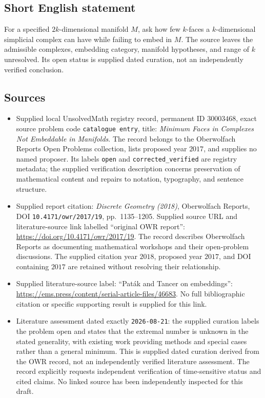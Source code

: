 \documentclass[11pt]{article}
\begin{document}
\subsection{Short English statement}
For a specified \(2k\)-dimensional manifold \(M\), ask how few \(k\)-faces a \(k\)-dimensional simplicial complex can have while failing to embed in \(M\). The source leaves the admissible complexes, embedding category, manifold hypotheses, and range of \(k\) unresolved. Its open status is supplied dated curation, not an independently verified conclusion.
\subsection{Sources}
\begin{itemize}
\item Supplied local UnsolvedMath registry record, permanent ID \(30003468\), exact source problem code \texttt{catalogue entry}, title: \emph{Minimum Faces in Complexes Not Embeddable in Manifolds}. The record belongs to the Oberwolfach Reports Open Problems collection, lists proposed year \(2017\), and supplies no named proposer. Its labels \texttt{open} and \texttt{corrected\_verified} are registry metadata; the supplied verification description concerns preservation of mathematical content and repairs to notation, typography, and sentence structure.
\item Supplied report citation: \emph{Discrete Geometry (2018)}, Oberwolfach Reports, DOI \texttt{10.4171/owr/2017/19}, pp.\ 1135--1205. Supplied source URL and literature-source link labelled ``original OWR report'': \url{https://doi.org/10.4171/owr/2017/19}. The record describes Oberwolfach Reports as documenting mathematical workshops and their open-problem discussions. The supplied citation year \(2018\), proposed year \(2017\), and DOI containing \(2017\) are retained without resolving their relationship.
\item Supplied literature-source label: ``Pat\'ak and Tancer on embeddings'': \url{https://ems.press/content/serial-article-files/46683}. No full bibliographic citation or specific supporting result is supplied for this link.
\item Literature assessment dated exactly \texttt{2026-08-21}: the supplied curation labels the problem open and states that the extremal number is unknown in the stated generality, with existing work providing methods and special cases rather than a general minimum. This is supplied dated curation derived from the OWR record, not an independently verified literature assessment. The record explicitly requests independent verification of time-sensitive status and cited claims. No linked source has been independently inspected for this draft.
\end{itemize}
\end{document}
